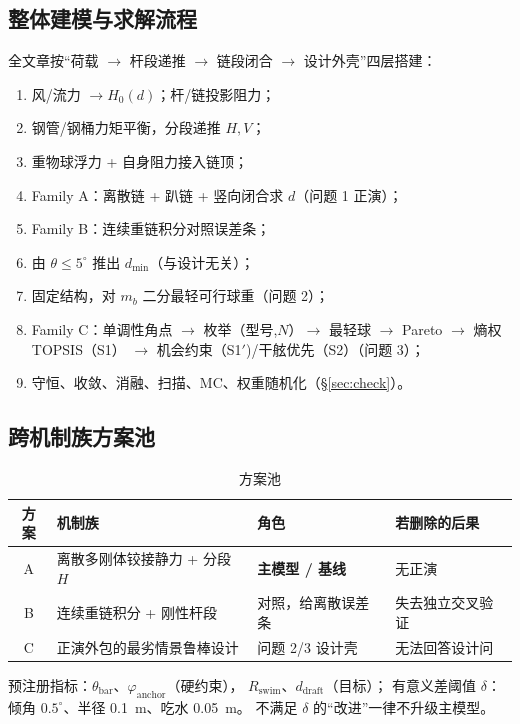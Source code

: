 \documentclass[UTF8,a4paper,zihao=-4]{ctexart}
\begin{document}
\subsection{整体建模与求解流程}

全文章按“荷载 \(\to\) 杆段递推 \(\to\) 链段闭合 \(\to\) 设计外壳”四层搭建：
\begin{enumerate}[leftmargin=1.6em,itemsep=0.12em]
  \item 风/流力 \(\to H_0(d)\)；杆/链投影阻力；
  \item 钢管/钢桶力矩平衡，分段递推 \(H,V\)；
  \item 重物球浮力 + 自身阻力接入链顶；
  \item Family A：离散链 + 趴链 + 竖向闭合求 \(d\)（问题 1 正演）；
  \item Family B：连续重链积分对照误差条；
  \item 由 \(\theta\le5^\circ\) 推出 \(d_{\min}\)（与设计无关）；
  \item 固定结构，对 \(m_b\) 二分最轻可行球重（问题 2）；
  \item Family C：单调性角点 \(\to\) 枚举（型号,\(N\)）\(\to\) 最轻球
        \(\to\) Pareto \(\to\) 熵权 TOPSIS（S1）
        \(\to\) 机会约束（S1\('\))/干舷优先（S2）（问题 3）；
  \item 守恒、收敛、消融、扫描、MC、权重随机化（\S\ref{sec:check}）。
\end{enumerate}

\subsection{跨机制族方案池}

\begin{table}[H]
\centering
\caption{方案池}
\begin{tabular}{clll}
\toprule
方案 & 机制族 & 角色 & 若删除的后果 \\
\midrule
A & 离散多刚体铰接静力 + 分段 \(H\) & \textbf{主模型 / 基线} & 无正演 \\
B & 连续重链积分 + 刚性杆段 & 对照，给离散误差条 & 失去独立交叉验证 \\
C & 正演外包的最劣情景鲁棒设计 & 问题 2/3 设计壳 & 无法回答设计问 \\
\bottomrule
\end{tabular}
\end{table}

预注册指标：\(\theta_{\mathrm{bar}}\)、\(\varphi_{\mathrm{anchor}}\)（硬约束），
\(R_{\mathrm{swim}}\)、\(d_{\mathrm{draft}}\)（目标）；
有意义差阈值 \(\delta\)：倾角 \(0.5^\circ\)、半径 \SI{0.1}{m}、吃水 \SI{0.05}{m}。
不满足 \(\delta\) 的“改进”一律不升级主模型。
\end{document}
